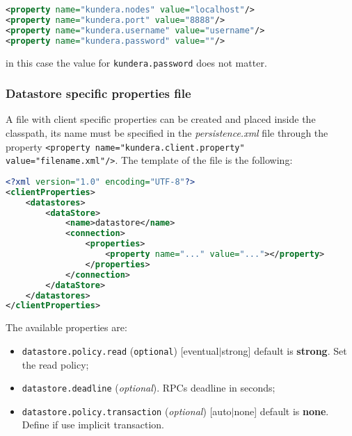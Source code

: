 \begin{lstlisting}[language=XML, caption=GAE Datastore emulator configuration]
<property name="kundera.nodes" value="localhost"/>
<property name="kundera.port" value="8888"/>
<property name="kundera.username" value="username"/>
<property name="kundera.password" value=""/>
\end{lstlisting}

\noindent in this case the value for \texttt{kundera.password} does not matter.

\subsubsection{Datastore specific properties file}
A file with client specific properties can be created and placed inside the classpath, its name must be specified in the \textit{persistence.xml} file through the property \texttt{<property name="kundera.client.property" value="filename.xml"/>}.
The template of the file is the following:

\begin{lstlisting}[language=XML, caption=GAE Datastore - datastore specific configuration]
<?xml version="1.0" encoding="UTF-8"?>
<clientProperties>
    <datastores>
        <dataStore>
            <name>datastore</name>
            <connection>
                <properties>
                    <property name="..." value="..."></property>
                </properties>
            </connection>
        </dataStore>
    </datastores>
</clientProperties>
\end{lstlisting}

\noindent The available properties are:
\begin{itemize}
\item \texttt{datastore.policy.read} (\texttt{optional}) [eventual$\vert$strong] default is \textbf{strong}. Set the read policy;
\item \texttt{datastore.deadline} (\textit{optional}). RPCs deadline in seconds;
\item \texttt{datastore.policy.transaction} (\textit{optional}) [auto$\vert$none] default is \textbf{none}. Define if use implicit transaction.
\end{itemize}

